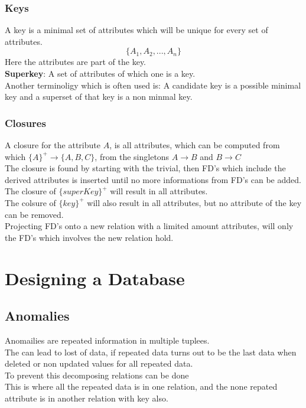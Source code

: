 \documentclass[12pt, a4paper]{article}
\begin{document}
		\subsubsection{Keys}
			A key is a minimal set of attributes which will be unique for every set of attributes.\\
			$$\{A_1,A_2,...,A_n\}$$
			Here the attributes are part of the key.\\
			\textbf{Superkey}: A set of attributes of which one is a key.\\
			Another terminoligy which is often used is: A candidate key is a possible minimal key and a superset of that key is a non minmal key.
		\subsubsection{Closures}
				  A closure for the attribute $A$, is all attributes, which can be computed from which $\{A\}^+\rightarrow \{A,B,C\}$, from the singletons $A\rightarrow B$ and $B\rightarrow C$\\
				  The closure is found by starting with the trivial, then FD's which include the derived attributes is inserted until no more informations from FD's can be added.\\
				  The closure of $\{superKey\}^+$ will result in all attributes.\\
				  The colsure of $\{key\}^+$ will also result in all attributes, but no attribute of the key can be removed.\\
				  Projecting FD's onto a new relation with a limited amount attributes, will only the FD's which involves the new relation hold.
	\section{Designing a Database}
		\subsection{Anomalies}
			Anomailies are repeated information in multiple tuplees.\\
			The can lead to lost of data, if repeated data turns out to be the last data when deleted or non updated values for all repeated data.\\
			To prevent this decomposing relations can be done\\
			This is where all the repeated data is in one relation, and the none repated attribute is in another relation with key also.\\
\end{document}
